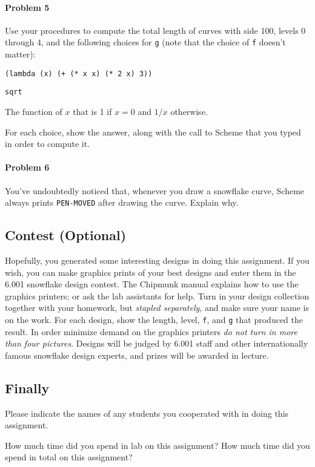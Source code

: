 \paragraph{Problem 5} Use your procedures to compute the total length
of curves with side 100, levels 0 through 4, and the following choices
for {\tt g} (note that the choice of {\tt f} doesn't matter):
\begin{tightlist}
\item {\tt (lambda (x) (+ (* x x) (* 2 x) 3))}
\item {\tt sqrt}
\item The function of $x$ that is 1 if $x=0$ and $1/x$ otherwise.
\end{tightlist}
For each choice, show the answer, along with the call to Scheme that
you typed in order to compute it.

\paragraph{Problem 6} You've undoubtedly noticed that, whenever you draw
a snowflake curve, Scheme always prints {\tt PEN-MOVED} after drawing
the curve.  Explain why.

\subsection{Contest (Optional)}

Hopefully, you generated some interesting designs in doing this
assignment.  If you wish, you can make graphics prints of your best
designs and enter them in the 6.001 snowflake design contest.  The
Chipmunk manual explains how to use the graphics printers; or ask the
lab assistants for help.  Turn in your design collection together with
your homework, but {\em stapled separately}, and make sure your name
is on the work.  For each design, show the length, level, {\tt f}, and
{\tt g} that produced the result.  In order minimize demand on the
graphics printers {\em do not turn in more than four pictures}.
Designs will be judged by 6.001 staff and other internationally famous
snowflake design experts, and prizes will be awarded in lecture.


\subsection{Finally}

Please indicate the names of any students you cooperated with in doing
this assignment.

How much time did you spend in lab on this assignment?  How much time
did you spend in total on this assignment?




